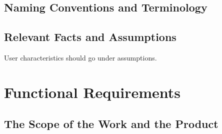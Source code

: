 \documentclass[12pt]{article}
\begin{document}
\subsection{Naming Conventions and Terminology}

\subsection{Relevant Facts and Assumptions}

User characteristics should go under assumptions.

\section{Functional Requirements}

\subsection{The Scope of the Work and the Product}
\end{document}
